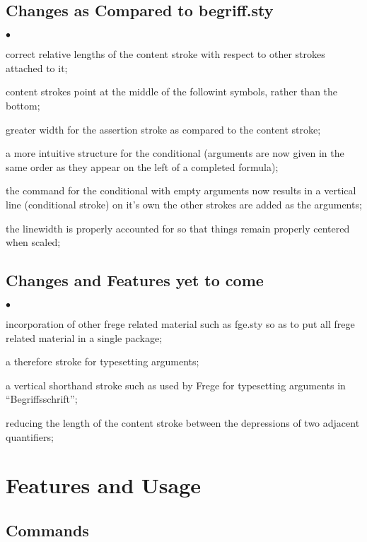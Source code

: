\documentclass[12pt]{article}
\newcommand{\squishlist}{
  \begin{list}{$\bullet$}{
    \setlength{\itemsep}{0pt}
    \setlength{\parsep}{0pt}
    \setlength{\topsep}{0pt}
    \setlength{\partopsep}{0pt}
    \setlength{\leftmargin}{1em}
    \setlength{\labelwidth}{1em}
    \setlength{\parskip}{0pt}
    \setlength{\partopsep}{0pt}
    \setlength{\rightmargin}{0pt}
    \setlength{\labelsep}{0.5em}}}
\newcommand{\squishlistend}{\end{list}}
\begin{document}
\subsection{Changes as Compared to begriff.sty}
  \squishlist
    \item correct relative lengths of the content stroke with respect to other 
      strokes attached to it;
    \item content strokes point at the middle of the followint symbols, rather 
      than the bottom;
    \item greater width for the assertion stroke as compared to the content stroke;
    \item a more intuitive structure for the conditional (arguments are now given in 
      the same order as they appear on the left of a completed formula);
    \item the command for the conditional with empty arguments now results in a 
      vertical line (conditional stroke) on it's own the other strokes are added as   
      the arguments;
    \item the linewidth is properly accounted for so that things remain properly 
      centered when scaled;
  \squishlistend

\subsection{Changes and Features yet to come}
  \squishlist
    \item incorporation of other frege related material such as fge.sty so as to put 
      all frege related material in a single package;
    \item a therefore stroke for typesetting arguments;
    \item a vertical shorthand stroke such as used by Frege for typesetting arguments 
      in ``Begriffsschrift'';
    \item reducing the length of the content stroke between the depressions of two 
      adjacent quantifiers;
  \squishlistend

\section{Features and Usage}
\subsection{Commands}
\end{document}
